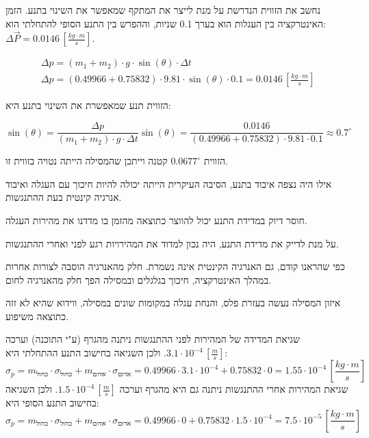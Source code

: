 \documentclass[14pt]{extarticle}
\begin{document}
נחשב את הזווית הנדרשת על מנת לייצר את המתקף שמאפשר את השינוי בתנע. הזמן האינטרקציה  בין העגלות  הוא בערך 0.1 שניות, וההפרש בין התנע הסופי להתחלתי הוא: $\Delta \vec{P} = 0.0146 \, [\frac{kg \cdot m}{s}]$.

\begin{center}
    \begin{equation*}
        \begin{aligned}
            \Delta p = (m_1 + m_2) \cdot g \cdot \sin(\theta) \cdot \Delta t \\
            \Delta p = (0.49966 + 0.75832) \cdot 9.81 \cdot \sin(\theta) \cdot 0.1 = 0.0146 \, [\frac{kg \cdot m}{s}]
        \end{aligned}
    \end{equation*}
\end{center}

הזווית תנע שמאפשרת את השינוי בתנע היא:

\begin{equation*}
    \sin(\theta) = \frac{\Delta p}{(m_1 + m_2) \cdot g \cdot \Delta t}
    \sin(\theta) = \frac{0.0146}{(0.49966 + 0.75832) \cdot 9.81 \cdot 0.1} \approx 0.7^{\circ}
\end{equation*}

הזווית $0.0677^{\circ}$ קטנה וייתכן שהמסילה הייתה נטויה בזווית זו.

אילו היה נצפה איבוד בתנע, הסיבה העיקרית הייתה יכולה להיות חיכוך עם העגלה ואיבוד אנרגיה קינטית בעת ההתנגשות.

חוסר דיוק  במדידת התנע יכול להווצר כתוצאה מהזמן בו מדדנו את מהירות העגלה.

על מנת לדייק את מדידת התנע, היה נכון למדוד את המהירויות רגע לפני ואחרי ההתנגשות.

כפי שהראנו קודם, גם האנרגיה הקינטית אינה נשמרת. חלק מהאנרגיה הוסבה לצורות אחרות במהלך האינטרקציה, חיכוך בגלגלים ובמסילה הפך חלק מהאנרגיה לחום.

איזון המסילה נעשה בעזרת פלס, והנחת עגלה במקומות שונים במסילה, ווידוא שהיא לא זזה כתוצאה משיפוע.

שגיאת המדידה של  המהירות לפני ההתנגשות ניתנה מהגרף (ע"י התוכנה)  וערכה $3.1 \cdot 10^{-4} \, [\frac{m}{s}]$. ולכן השגיאה בחישוב התנע ההתחלתי היא:
\begin{equation*}
    \sigma_p = m_{\textbf{כחול}} \cdot \sigma_{\textbf{כחול}} + m_{\textbf{אדום}} \cdot \sigma_{\textbf{אדום}} = 0.49966 \cdot 3.1 \cdot 10^{-4} + 0.75832 \cdot 0 = 1.55 \cdot 10^{-4} \, [\frac{kg \cdot m}{s}]
\end{equation*}
שגיאת המהירות אחרי ההתנגשות ניתנה גם היא מהגרף וערכה $1.5 \cdot 10^{-4} \, [\frac{m}{s}]$. ולכן השגיאה בחישוב התנע הסופי היא:
\begin{equation*}
    \sigma_p = m_{\textbf{כחול}} \cdot \sigma_{\textbf{כחול}} + m_{\textbf{אדום}} \cdot \sigma_{\textbf{אדום}} = 0.49966 \cdot 0 + 0.75832 \cdot  1.5 \cdot 10^{-4} = 7.5 \cdot 10^{-5} \, [\frac{kg \cdot m}{s}]
\end{equation*}
\end{document}
